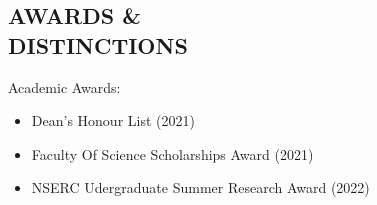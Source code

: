 \documentclass[margin, 10pt]{res} %
\begin{document}
\begin{resume}
		
		\section{AWARDS \& \\ DISTINCTIONS}
		Academic Awards:
		\vspace*{0.15cm}
		\begin{itemize}\itemsep -2pt %
			\item Dean's Honour List (2021)
			\item Faculty Of Science Scholarships Award (2021)
			\item NSERC Udergraduate Summer Research Award (2022)
		\end{itemize}
		
		

\end{resume}
\end{document}
